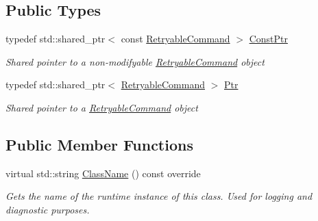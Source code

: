 \subsection*{Public Types}
\begin{DoxyCompactItemize}
\item 
typedef std\+::shared\+\_\+ptr$<$ const \mbox{\hyperlink{class_command_lib_1_1_retryable_command}{Retryable\+Command}} $>$ \mbox{\hyperlink{class_command_lib_1_1_retryable_command_a8fadc39a8e4e18ddf7f468299dc55098}{Const\+Ptr}}
\begin{DoxyCompactList}\small\item\em Shared pointer to a non-\/modifyable \mbox{\hyperlink{class_command_lib_1_1_retryable_command}{Retryable\+Command}} object\end{DoxyCompactList}\item 
typedef std\+::shared\+\_\+ptr$<$ \mbox{\hyperlink{class_command_lib_1_1_retryable_command}{Retryable\+Command}} $>$ \mbox{\hyperlink{class_command_lib_1_1_retryable_command_a5bb8960c450efd6e72f93a2409c73d4c}{Ptr}}
\begin{DoxyCompactList}\small\item\em Shared pointer to a \mbox{\hyperlink{class_command_lib_1_1_retryable_command}{Retryable\+Command}} object\end{DoxyCompactList}\end{DoxyCompactItemize}
\subsection*{Public Member Functions}
\begin{DoxyCompactItemize}
\item 
\mbox{\label{class_command_lib_1_1_retryable_command_ace5c335248d89b0bf162de17a9579a74}} 
virtual std\+::string \mbox{\hyperlink{class_command_lib_1_1_retryable_command_ace5c335248d89b0bf162de17a9579a74}{Class\+Name}} () const override
\begin{DoxyCompactList}\small\item\em Gets the name of the runtime instance of this class. Used for logging and diagnostic purposes.  \end{DoxyCompactList}\end{DoxyCompactItemize}
